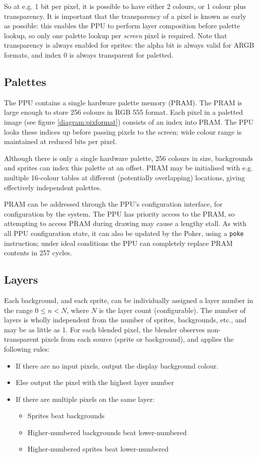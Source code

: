 So at e.g. 1 bit per pixel, it is possible to have either 2 colours, or 1 colour plus transparency. It is important that the transparency of a pixel is known as early as possible: this enables the PPU to perform layer composition before palette lookup, so only one palette lookup per {\it screen} pixel is required. Note that transparency is always enabled for sprites: the alpha bit is always valid for ARGB formats, and index 0 is always transparent for paletted.


\subsection{Palettes}

The PPU contains a single hardware palette memory (PRAM). The PRAM is large enough to store 256 colours in RGB 555 format. Each pixel in a paletted image (see figure \ref{diagram:pixformat}) consists of an index into PRAM. The PPU looks these indices up before passing pixels to the screen; wide colour range is maintained at reduced bits per pixel.

Although there is only a single hardware palette, 256 colours in size, backgrounds and sprites can index this palette at an offset. PRAM may be initialised with e.g. multiple 16-colour tables at different (potentially overlapping) locations, giving effectively independent palettes.

PRAM can be addressed through the PPU's configuration interface, for configuration by the system. The PPU has priority access to the PRAM, so attempting to access PRAM during drawing may cause a lengthy stall. As with all PPU configuration state, it can also be updated by the Poker, using a {\tt poke} instruction; under ideal conditions the PPU can completely replace PRAM contents in 257 cycles.

\subsection{Layers}

Each background, and each sprite, can be individually assigned a layer number in the range $0 \leq n < N$, where $N$ is the layer count (configurable). The number of layers is wholly independent from the number of sprites, backgrounds, etc., and may be as little as 1. For each blended pixel, the blender observes non-transparent pixels from each source (sprite or background), and applies the following rules:

\begin{itemize}
	\item If there are no input pixels, output the display background colour.
	\item Else output the pixel with the highest layer number
	\item If there are multiple pixels on the same layer:
	\begin{itemize}
		\item Sprites beat backgrounds
		\item Higher-numbered backgrounds beat lower-numbered
		\item Higher-numbered sprites beat lower-numbered
	\end{itemize}
\end{itemize}


